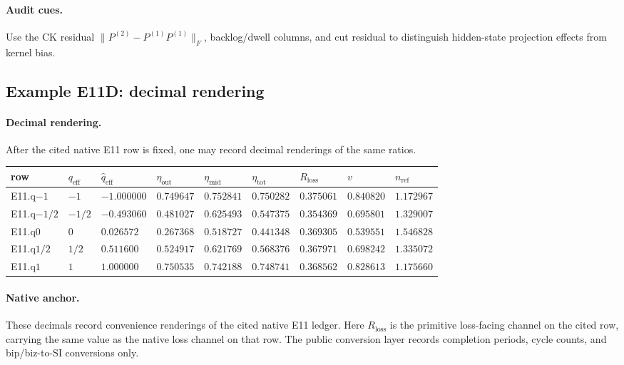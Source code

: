 \paragraph{Audit cues.} Use the CK residual $\|P^{(2)}-P^{(1)}P^{(1)}\|_F$, backlog/dwell columns, and cut residual to distinguish hidden-state projection effects from kernel bias.

\subsection{Example E11D: decimal rendering}\label{app:e11-dict}
\paragraph{Decimal rendering.} After the cited native E11 row is fixed, one may record decimal renderings of the same ratios.
{\footnotesize
\begin{center}
\begin{tabular}{@{}lllllllll@{}}
\toprule
row & $q_{\mathrm{eff}}$ & $\widehat q_{\mathrm{eff}}$ & $\eta_{\mathrm{out}}$ & $\eta_{\mathrm{mid}}$ & $\eta_{\mathrm{tot}}$ & $R_{\mathrm{loss}}$ & $v$ & $n_{\mathrm{ref}}$ \\
\midrule
E11.q$-1$ & $-1$ & $-1.000000$ & $0.749647$ & $0.752841$ & $0.750282$ & $0.375061$ & $0.840820$ & $1.172967$ \\
E11.q$-1/2$ & $-1/2$ & $-0.493060$ & $0.481027$ & $0.625493$ & $0.547375$ & $0.354369$ & $0.695801$ & $1.329007$ \\
E11.q$0$ & $0$ & $0.026572$ & $0.267368$ & $0.518727$ & $0.441348$ & $0.369305$ & $0.539551$ & $1.546828$ \\
E11.q$1/2$ & $1/2$ & $0.511600$ & $0.524917$ & $0.621769$ & $0.568376$ & $0.367971$ & $0.698242$ & $1.335072$ \\
E11.q$1$ & $1$ & $1.000000$ & $0.750535$ & $0.742188$ & $0.748741$ & $0.368562$ & $0.828613$ & $1.175660$ \\
\bottomrule
\end{tabular}
\end{center}}
\paragraph{Native anchor.} These decimals record convenience renderings of the cited native E11 ledger. Here $R_{\mathrm{loss}}$ is the primitive loss-facing channel on the cited row, carrying the same value as the native loss channel on that row. The public conversion layer records completion periods, cycle counts, and bip/biz-to-SI conversions only.
